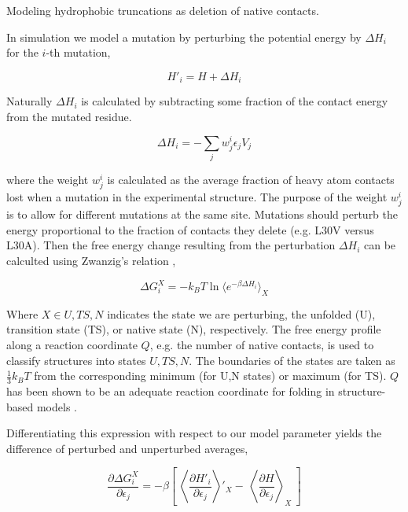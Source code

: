 \documentclass[preprint]{elsarticle}
\begin{document}
    Modeling hydrophobic truncations as deletion of native contacts.

    In simulation we model a mutation by perturbing the potential energy by
$\Delta H_i$ for the $i$-th mutation,

\begin{equation}
    H'_i = H + \Delta H_i
\end{equation}

    Naturally $\Delta H_i$ is calculated by subtracting some fraction of the
contact energy from the mutated residue.

\begin{equation}
\label{eq:Perturbation}
\Delta H_i = -\sum\limits_{j} w^i_j\epsilon_{j} V_{j}
\end{equation}

where the weight $w^i_j$ is calculated as the average fraction of heavy atom
contacts lost when a mutation in the experimental structure. The purpose of the
weight $w^i_j$ is to allow for different mutations at the same site. Mutations
should perturb the energy proportional to the fraction of contacts they delete
(e.g. L30V versus L30A). Then the free energy change resulting from the
perturbation $\Delta H_i$ can be calculted using Zwanzig's relation
\cite{Zwanzig1954},

\begin{equation}
    \Delta G^X_i = -k_BT \ln\langle e^{-\beta \Delta H_i}\rangle_X
\end{equation}

Where $X \in {U,TS,N}$ indicates the state we are perturbing, the unfolded (U),
transition state (TS), or native state (N), respectively. The free energy
profile along a reaction coordinate $Q$, e.g. the number of native contacts, is
used to classify structures into states ${U,TS,N}$. The boundaries of the
states are taken as $\frac{1}{3}k_BT$ from the corresponding minimum (for U,N
states) or maximum (for TS). $Q$ has been shown to be an adequate reaction
coordinate for folding in structure-based models \cite{Cho2006}.

    Differentiating this expression with respect to our model parameter yields
the difference of perturbed and unperturbed averages,

\begin{equation}
    \frac{\partial \Delta G^X_i}{\partial\epsilon_j} = -\beta\left[ \
    \left\langle \frac{\partial H'_i}{\partial\epsilon_j} \right\rangle'_X -\
    \left\langle \frac{\partial H}{\partial\epsilon_j} \right\rangle_X \
    \right]
\end{equation}
\end{document}
